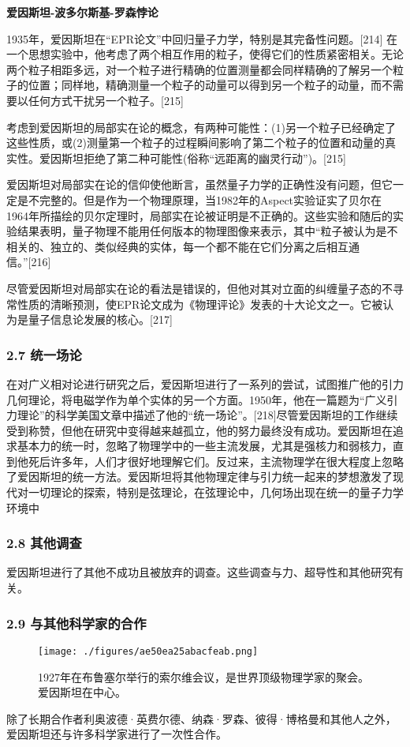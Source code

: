 \textbf{爱因斯坦-波多尔斯基-罗森悖论}

1935年，爱因斯坦在“EPR论文”中回归量子力学，特别是其完备性问题。[214] 在一个思想实验中，他考虑了两个相互作用的粒子，使得它们的性质紧密相关。无论两个粒子相距多远，对一个粒子进行精确的位置测量都会同样精确的了解另一个粒子的位置；同样地，精确测量一个粒子的动量可以得到另一个粒子的动量，而不需要以任何方式干扰另一个粒子。[215]

考虑到爱因斯坦的局部实在论的概念，有两种可能性：(1)另一个粒子已经确定了这些性质，或(2)测量第一个粒子的过程瞬间影响了第二个粒子的位置和动量的真实性。爱因斯坦拒绝了第二种可能性(俗称“远距离的幽灵行动”)。[215]

爱因斯坦对局部实在论的信仰使他断言，虽然量子力学的正确性没有问题，但它一定是不完整的。但是作为一个物理原理，当1982年的Aspect实验证实了贝尔在1964年所描绘的贝尔定理时，局部实在论被证明是不正确的。这些实验和随后的实验结果表明，量子物理不能用任何版本的物理图像来表示，其中“粒子被认为是不相关的、独立的、类似经典的实体，每一个都不能在它们分离之后相互通信。”[216]

尽管爱因斯坦对局部实在论的看法是错误的，但他对其对立面的纠缠量子态的不寻常性质的清晰预测，使EPR论文成为《物理评论》发表的十大论文之一。它被认为是量子信息论发展的核心。[217]

\subsubsection{2.7 统一场论}
在对广义相对论进行研究之后，爱因斯坦进行了一系列的尝试，试图推广他的引力几何理论，将电磁学作为单个实体的另一个方面。1950年，他在一篇题为“广义引力理论”的科学美国文章中描述了他的“统一场论”。[218]尽管爱因斯坦的工作继续受到称赞，但他在研究中变得越来越孤立，他的努力最终没有成功。爱因斯坦在追求基本力的统一时，忽略了物理学中的一些主流发展，尤其是强核力和弱核力，直到他死后许多年，人们才很好地理解它们。反过来，主流物理学在很大程度上忽略了爱因斯坦的统一方法。爱因斯坦将其他物理定律与引力统一起来的梦想激发了现代对一切理论的探索，特别是弦理论，在弦理论中，几何场出现在统一的量子力学环境中

\subsubsection{2.8 其他调查}
爱因斯坦进行了其他不成功且被放弃的调查。这些调查与力、超导性和其他研究有关。

\subsubsection{2.9 与其他科学家的合作}
\begin{figure}[ht]
\centering
\texttt{[image: ./figures/ae50ea25abacfeab.png]}
\caption{1927年在布鲁塞尔举行的索尔维会议，是世界顶级物理学家的聚会。爱因斯坦在中心。} \label{fig_AYST_23}
\end{figure}
除了长期合作者利奥波德·英费尔德、纳森·罗森、彼得·博格曼和其他人之外，爱因斯坦还与许多科学家进行了一次性合作。

